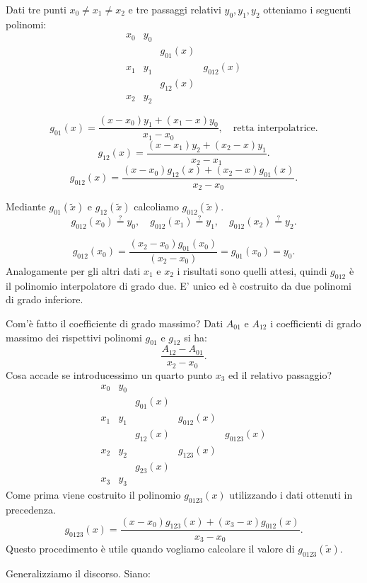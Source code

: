 \begin{exe}Dati tre punti $x_0 \neq x_1 \neq x_2$ e tre passaggi relativi
$y_0, y_1, y_2$ otteniamo i seguenti polinomi:
\[\begin{array}{cccc}
x_0 & y_0 &  &  \\
    &     & g_{01}(x) & \\
x_1 & y_1 &  & g_{012}(x)  \\
    &     &  g_{12}(x) & \\
x_2 & y_2 &
\end{array}\]

\[g_{01}(x) = \frac{(x-x_0)y_1 + (x_1-x)y_0}{x_1 - x_0}, \quad \textrm{retta
interpolatrice.}\]
\[g_{12}(x) = \frac{(x-x_1)y_2 + (x_2-x)y_1}{x_2 - x_1}.\]
\[g_{012}(x) = \frac{(x-x_0)g_{12}(x) + (x_2-x)g_{01}(x)}{x_2 - x_0}.\]

Mediante $g_{01}(\tilde{x})$ e $g_{12}(\tilde{x})$ calcoliamo
$g_{012}(\tilde{x})$.
\[g_{012}(x_0) \stackrel{?}{=} y_0, \quad
g_{012}(x_1) \stackrel{?}{=} y_1, \quad
g_{012}(x_2) \stackrel{?}{=} y_2.\]

\[g_{012}(x_0) = \frac{(x_2 - x_0)g_{01}(x_0)}{(x_2-x_0)} = g_{01}(x_0) = y_0.\]
Analogamente per gli altri dati $x_1$ e $x_2$ i risultati sono quelli attesi,
quindi $g_{012}$ è il polinomio interpolatore di grado due. E' unico ed è
costruito da due polinomi di grado inferiore.

Com'è fatto il coefficiente di grado massimo? Dati $A_{01}$ e $A_{12}$ i
coefficienti di grado massimo dei rispettivi polinomi $g_{01}$ e $g_{12}$ si
ha:
\[\frac{A_{12}-A_{01}}{x_2 - x_0}.\]
Cosa accade se introducessimo un quarto punto $x_3$ ed il relativo passaggio?
\[\begin{array}{ccccc}
x_0 & y_0 &  &  &\\
    &     & g_{01}(x) & &\\
x_1 & y_1 &  & g_{012}(x)  &\\
    &     &  g_{12}(x) & &g_{0123}(x)\\
x_2 & y_2 & & g_{123}(x)&\\
    &     & g_{23}(x) & &\\
x_3 & y_3 &
\end{array}\]
Come prima viene costruito il polinomio $g_{0123}(x)$ utilizzando i dati
ottenuti in precedenza.
\[g_{0123}(x) = \frac{(x-x_0)g_{123}(x) + (x_3-x)g_{012}(x)}{x_3-x_0}.\]
Questo procedimento è utile quando vogliamo calcolare il valore di
$g_{0123}(\tilde{x})$.
\end{exe}

Generalizziamo il discorso. Siano:

